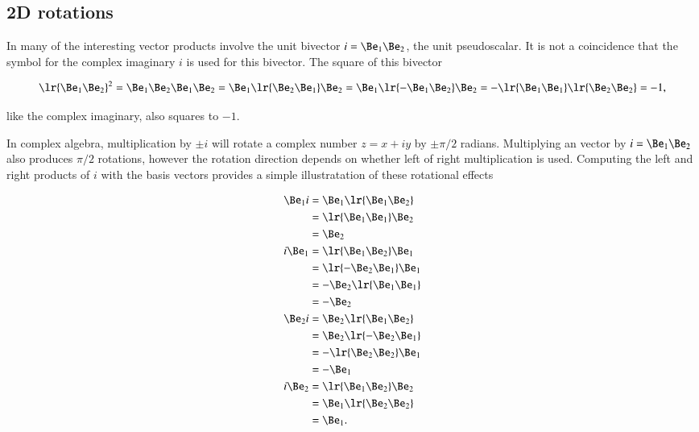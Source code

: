 
\subsection{2D rotations}

In  many of the interesting vector products involve the unit bivector \( i = \Be_1 \Be_2 \), the  unit pseudoscalar.
It is not a coincidence that the symbol for the complex imaginary \( i \) is used for this bivector.
The square of this bivector

\begin{dmath}\label{eqn:SimpleProducts2:220}
   \lr{ \Be_1 \Be_2 }^2
   =
   \Be_1 \Be_2
   \Be_1 \Be_2
   =
   \Be_1 \lr{ \Be_2 \Be_1 } \Be_2
   =
   \Be_1 \lr{ -\Be_1 \Be_2 } \Be_2
   =
   -\lr{ \Be_1 \Be_1 }
   \lr{ \Be_2 \Be_2 }
   = -1,
\end{dmath}

like the complex imaginary, also squares to \( -1 \).

In complex algebra, multiplication by \( \pm i \) will rotate a complex number \( z = x + i y \) by \( \pm \pi/2 \) radians.
Multiplying an  vector by \( i = \Be_1 \Be_2 \) also produces \( \pi/2 \) rotations, however the rotation direction depends on whether left of right multiplication is used.
Computing the left and right products of \( i \) with the  basis vectors provides a
simple illustratation of these rotational effects

\begin{dmath}\label{eqn:SimpleProducts2:180}
\begin{aligned}
   \Be_1 i &= \Be_1 \lr{ \Be_1 \Be_2 } \\
           &= \lr{ \Be_1 \Be_1 } \Be_2 \\
           &= \Be_2 \\
   i \Be_1 &= \lr{ \Be_1 \Be_2 } \Be_1 \\
           &= \lr{ -\Be_2 \Be_1 } \Be_1 \\
           &= -\Be_2 \lr{ \Be_1 \Be_1 } \\
           &= -\Be_2 \\
   \Be_2 i &= \Be_2 \lr{ \Be_1 \Be_2 } \\
           &= \Be_2 \lr{ -\Be_2 \Be_1 } \\
           &= -\lr{ \Be_2 \Be_2 }\Be_1 \\
           &= -\Be_1 \\
   i \Be_2 &= \lr{ \Be_1 \Be_2 } \Be_2 \\
           &= \Be_1 \lr{ \Be_2 \Be_2 } \\
           &= \Be_1.
\end{aligned}
\end{dmath}

